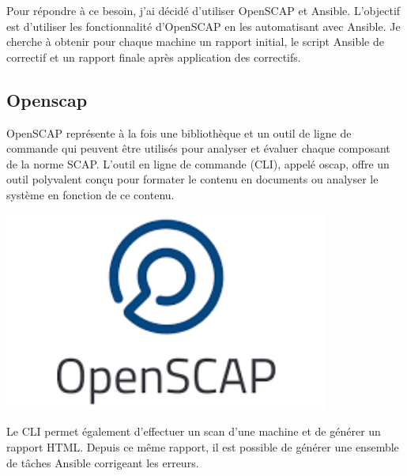 \documentclass[12pt, a4paper, twoside]{article}
\begin{document}
Pour répondre à ce besoin, j'ai décidé d'utiliser \gls{OpenSCAP} et \gls{Ansible}. 
L'objectif est d'utiliser les fonctionnalité d'\gls{OpenSCAP} en les automatisant avec \gls{Ansible}.
Je cherche à obtenir pour chaque machine un rapport initial, le script \gls{Ansible} de correctif et un rapport finale après application des correctifs. 

\subsection{Openscap}
\noindent%
\begin{minipage}{.7\textwidth}%
\gls{OpenSCAP} représente à la fois une bibliothèque et un outil de ligne de commande qui peuvent être utilisés pour analyser et évaluer chaque composant de la norme \gls{SCAP}. 
L'outil en ligne de commande (\gls{CLI}), appelé oscap, offre un outil polyvalent conçu pour formater le contenu en documents ou analyser le système en fonction de ce contenu. \cite{OpenSCAP} \\
\end{minipage}%
\hfill
\begin{minipage}{.3\textwidth}%
\begin{center}
\includegraphics[width=0.8\textwidth]{src/logo_openscap.png}
\end{center}
\end{minipage}%

Le \gls{CLI} permet également d'effectuer un scan d'une machine et de générer un rapport HTML.
Depuis ce même rapport, il est possible de générer une ensemble de tâches \gls{Ansible} corrigeant les erreurs.
\end{document}
